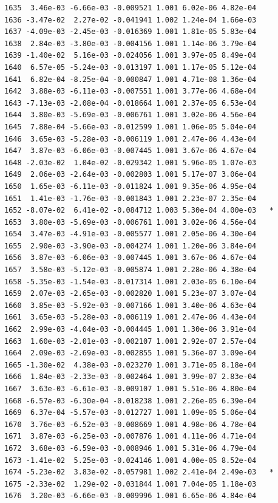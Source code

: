 \documentclass[
  letterpaper,
  DIV=11,
  numbers=noendperiod]{scrartcl}
\begin{document}
\begin{verbatim}
1635  3.46e-03 -6.66e-03 -0.009521 1.001 6.02e-06 4.82e-04    
1636 -3.47e-02  2.27e-02 -0.041941 1.002 1.24e-04 1.66e-03    
1637 -4.09e-03 -2.45e-03 -0.016369 1.001 1.81e-05 5.83e-04    
1638  2.84e-03 -3.80e-03 -0.004156 1.001 1.14e-06 3.79e-04    
1639 -1.40e-02  5.16e-03 -0.024056 1.001 3.97e-05 8.49e-04    
1640  6.57e-05 -5.24e-03 -0.013197 1.001 1.17e-05 5.12e-04    
1641  6.82e-04 -8.25e-04 -0.000847 1.001 4.71e-08 1.36e-04    
1642  3.88e-03 -6.11e-03 -0.007551 1.001 3.77e-06 4.68e-04    
1643 -7.13e-03 -2.08e-04 -0.018664 1.001 2.37e-05 6.53e-04    
1644  3.80e-03 -5.69e-03 -0.006761 1.001 3.02e-06 4.56e-04    
1645  7.88e-04 -5.66e-03 -0.012599 1.001 1.06e-05 5.04e-04    
1646  3.65e-03 -5.28e-03 -0.006119 1.001 2.47e-06 4.43e-04    
1647  3.87e-03 -6.06e-03 -0.007445 1.001 3.67e-06 4.67e-04    
1648 -2.03e-02  1.04e-02 -0.029342 1.001 5.96e-05 1.07e-03    
1649  2.06e-03 -2.64e-03 -0.002803 1.001 5.17e-07 3.06e-04    
1650  1.65e-03 -6.11e-03 -0.011824 1.001 9.35e-06 4.95e-04    
1651  1.41e-03 -1.76e-03 -0.001843 1.001 2.23e-07 2.35e-04    
1652 -8.07e-02  6.41e-02 -0.084712 1.003 5.30e-04 4.00e-03   *
1653  3.80e-03 -5.69e-03 -0.006761 1.001 3.02e-06 4.56e-04    
1654  3.47e-03 -4.91e-03 -0.005577 1.001 2.05e-06 4.30e-04    
1655  2.90e-03 -3.90e-03 -0.004274 1.001 1.20e-06 3.84e-04    
1656  3.87e-03 -6.06e-03 -0.007445 1.001 3.67e-06 4.67e-04    
1657  3.58e-03 -5.12e-03 -0.005874 1.001 2.28e-06 4.38e-04    
1658 -5.35e-03 -1.54e-03 -0.017314 1.001 2.03e-05 6.10e-04    
1659  2.07e-03 -2.65e-03 -0.002820 1.001 5.23e-07 3.07e-04    
1660  3.85e-03 -5.92e-03 -0.007166 1.001 3.40e-06 4.63e-04    
1661  3.65e-03 -5.28e-03 -0.006119 1.001 2.47e-06 4.43e-04    
1662  2.99e-03 -4.04e-03 -0.004445 1.001 1.30e-06 3.91e-04    
1663  1.60e-03 -2.01e-03 -0.002107 1.001 2.92e-07 2.57e-04    
1664  2.09e-03 -2.69e-03 -0.002855 1.001 5.36e-07 3.09e-04    
1665 -1.30e-02  4.38e-03 -0.023270 1.001 3.71e-05 8.18e-04    
1666  1.84e-03 -2.33e-03 -0.002464 1.001 3.99e-07 2.83e-04    
1667  3.63e-03 -6.61e-03 -0.009107 1.001 5.51e-06 4.80e-04    
1668 -6.57e-03 -6.30e-04 -0.018238 1.001 2.26e-05 6.39e-04    
1669  6.37e-04 -5.57e-03 -0.012727 1.001 1.09e-05 5.06e-04    
1670  3.76e-03 -6.52e-03 -0.008669 1.001 4.98e-06 4.78e-04    
1671  3.87e-03 -6.25e-03 -0.007876 1.001 4.11e-06 4.71e-04    
1672  3.68e-03 -6.59e-03 -0.008946 1.001 5.31e-06 4.79e-04    
1673 -1.41e-02  5.25e-03 -0.024146 1.001 4.00e-05 8.52e-04    
1674 -5.23e-02  3.83e-02 -0.057981 1.002 2.41e-04 2.49e-03   *
1675 -2.33e-02  1.29e-02 -0.031844 1.001 7.04e-05 1.18e-03    
1676  3.20e-03 -6.66e-03 -0.009996 1.001 6.65e-06 4.84e-04    

\end{verbatim}
\end{document}
